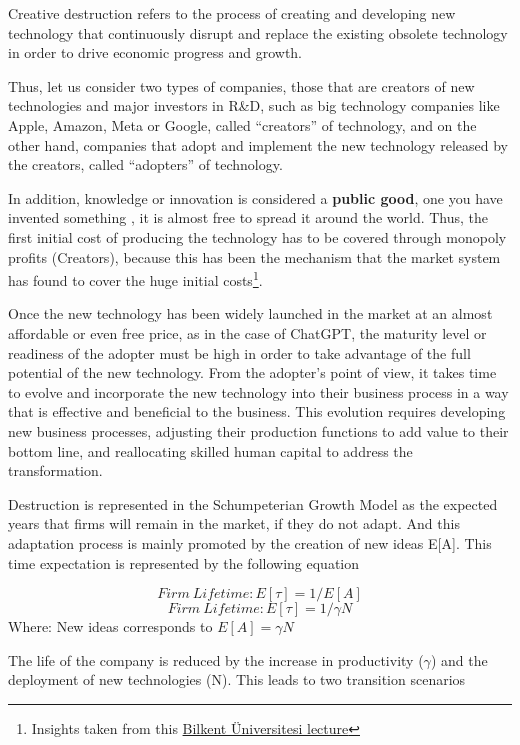 \documentclass[preprint, 1p,
authoryear]{elsarticle} %
\begin{document}
Creative destruction refers to the process of creating and developing
new technology that continuously disrupt and replace the existing
obsolete technology in order to drive economic progress and growth.

Thus, let us consider two types of companies, those that are creators of
new technologies and major investors in R\&D, such as big technology
companies like Apple, Amazon, Meta or Google, called ``creators'' of
technology, and on the other hand, companies that adopt and implement
the new technology released by the creators, called ``adopters'' of
technology.

In addition, knowledge or innovation is considered a \textbf{public
good}, one you have invented something , it is almost free to spread it
around the world. Thus, the first initial cost of producing the
technology has to be covered through monopoly profits (Creators),
because this has been the mechanism that the market system has found to
cover the huge initial costs\footnote{Insights taken from this
  \href{https://youtu.be/m3nkTrFF2zs?si=dgPJlvVgQuuQAcL8}{Bilkent
  Üniversitesi lecture}}.

Once the new technology has been widely launched in the market at an
almost affordable or even free price, as in the case of ChatGPT, the
maturity level or readiness of the adopter must be high in order to take
advantage of the full potential of the new technology. From the
adopter's point of view, it takes time to evolve and incorporate the new
technology into their business process in a way that is effective and
beneficial to the business. This evolution requires developing new
business processes, adjusting their production functions to add value to
their bottom line, and reallocating skilled human capital to address the
transformation.

Destruction is represented in the Schumpeterian Growth Model as the
expected years that firms will remain in the market, if they do not
adapt. And this adaptation process is mainly promoted by the creation of
new ideas E{[}A{]}. This time expectation is represented by the
following equation

\[
Firm \ Lifetime: E[\tau] = 1/E[A]
\] \[
Firm \ Lifetime: E[\tau] = 1/\gamma N
\] Where: New ideas corresponds to \(E[A] = \gamma N\)

The life of the company is reduced by the increase in productivity
(\(\gamma\)) and the deployment of new technologies (N). This leads to
two transition scenarios
\end{document}

